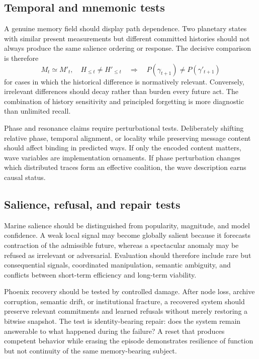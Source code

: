 \documentclass[11pt]{article}
\begin{document}
\subsection{Temporal and mnemonic tests}

A genuine memory field should display path dependence. Two planetary states with similar present measurements but different committed histories should not always produce the same salience ordering or response. The decisive comparison is therefore
\[
M_t \simeq M'_t, \quad H_{\leq t}\neq H'_{\leq t}
\quad\Longrightarrow\quad
P(\gamma_{t+1})\neq P(\gamma'_{t+1})
\]
for cases in which the historical difference is normatively relevant. Conversely, irrelevant differences should decay rather than burden every future act. The combination of history sensitivity and principled forgetting is more diagnostic than unlimited recall.

Phase and resonance claims require perturbational tests. Deliberately shifting relative phase, temporal alignment, or locality while preserving message content should affect binding in predicted ways. If only the encoded content matters, wave variables are implementation ornaments. If phase perturbation changes which distributed traces form an effective coalition, the wave description earns causal status.

\subsection{Salience, refusal, and repair tests}

Marine salience should be distinguished from popularity, magnitude, and model confidence. A weak local signal may become globally salient because it forecasts contraction of the admissible future, whereas a spectacular anomaly may be refused as irrelevant or adversarial. Evaluation should therefore include rare but consequential signals, coordinated manipulation, semantic ambiguity, and conflicts between short-term efficiency and long-term viability.

Phoenix recovery should be tested by controlled damage. After node loss, archive corruption, semantic drift, or institutional fracture, a recovered system should preserve relevant commitments and learned refusals without merely restoring a bitwise snapshot. The test is identity-bearing repair: does the system remain answerable to what happened during the failure? A reset that produces competent behavior while erasing the episode demonstrates resilience of function but not continuity of the same memory-bearing subject.
\end{document}
